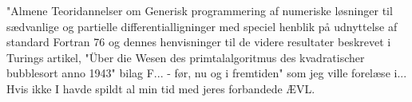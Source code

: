 \documentclass[a4paper,11pt]{article}
\begin{document}
\begin{sketch}
"Almene Teoridannelser om Generisk programmering af numeriske
  løsninger til sædvanlige og partielle differentialligninger med
  speciel henblik på udnyttelse af standard Fortran 76 og dennes
  henvisninger til de videre resultater beskrevet i Turings artikel,
  "Über die Wesen des primtalalgoritmus des kvadratischer bubblesort
  anno 1943"{} bilag F... - før, nu og i fremtiden"{} som jeg ville
  forelæse i... Hvis ikke I havde spildt al min tid med jeres
  forbandede ÆVL.
 
\end{sketch}
\end{document}
